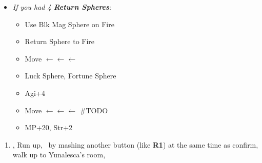 \begin{spheregrid}
    \begin{itemize}
        \item \textit{If you had 4 \textbf{Return Spheres}}:
            \begin{itemize}
                \item Use Blk Mag Sphere on Fire
                \item Return Sphere to Fire
                \item Move $\leftarrow\leftarrow\leftarrow$
                \item Luck Sphere, Fortune Sphere
                \item Agi+4
                \item Move $\leftarrow\leftarrow\leftarrow$ #TODO
                \item MP+20, Str+2
            \end{itemize}
    \end{itemize}
\end{spheregrid}
\begin{enumerate}[resume]
    \item \save, Run up, \sd\ by mashing another button (like \textbf{R1}) at the same time as confirm, walk up to Yunalesca's room, \sd
\end{enumerate}
